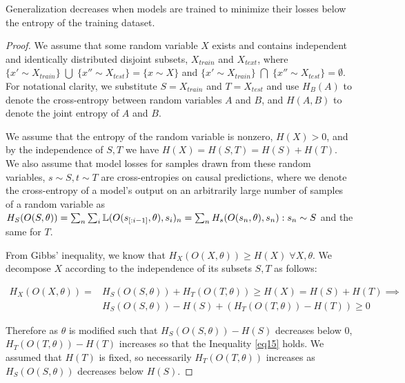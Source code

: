 \documentclass[10pt,a4paper]{amsart}
\begin{document}
    \begin{theorem}
        Generalization decreases when models are trained to minimize their losses below the entropy of the training dataset.
    \end{theorem}

    \begin{proof}

    We assume that some random variable $X$ exists and contains independent and identically distributed disjoint subsets, $X_{train}$ and $X_{text}$, where $\{x' \sim X_{train}\} \; \bigcup \; \{x'' \sim X_{test}\} = \{x \sim X\}$ and $\{x' \sim X_{train}\} \; \bigcap \; \{x'' \sim X_{test}\} = \emptyset$. For notational clarity, we substitute $S = X_{train}$ and $T = X_{test}$ and use $H_B(A)$ to denote the cross-entropy between random variables $A$ and $B$, and $H(A, B)$ to denote the joint entropy of $A$ and $B$. 
    
    We assume that the entropy of the random variable is nonzero, $H(X) > 0$, and by the independence of $S, T$ we have $H(X) = H(S, T) = H(S) + H(T)$.  We also assume that model losses for samples drawn from these random variables, $s \sim S, t \sim T$ are cross-entropies on causal predictions, where we denote the cross-entropy of a model's output on an arbitrarily large number of samples of a random variable as $H_S(O(S, \theta)) = \sum_n \sum_i\Bbb L(O(s_{[:i-1]}, \theta), s_i)_n = \sum_n H_s(O(s_n, \theta), s_n) :  s_n \sim S$ and the same for $T$.

    From Gibbs' inequality, we know that $H_X(O(X, \theta)) \geq H(X) \; \forall  X, \theta$. We decompose $X$ according to the independence of its subsets $S, T$ as follows:
    
    \begin{equation}
        \begin{split}
         H_X(O(X, \theta)) = & H_S(O(S, \theta)) + H_T(O(T, \theta)) \geq H(X) = H(S) + H(T) \implies \\
         & H_S(O(S, \theta)) - H(S) + \left( H_T(O(T, \theta)) - H(T)  \right) \geq 0 
         \end{split}
         \label{eq15}
    \end{equation}

    Therefore as $\theta$ is modified such that $H_S(O(S, \theta)) - H(S)$ decreases below $0$, $H_T(O(T, \theta)) - H(T)$ increases so that the Inequality \ref{eq15} holds. We assumed that $H(T)$ is fixed, so necessarily $H_T(O(T, \theta))$ increases as $H_S(O(S, \theta))$ decreases below $H(S)$. 
    

\end{proof}
\end{document}
